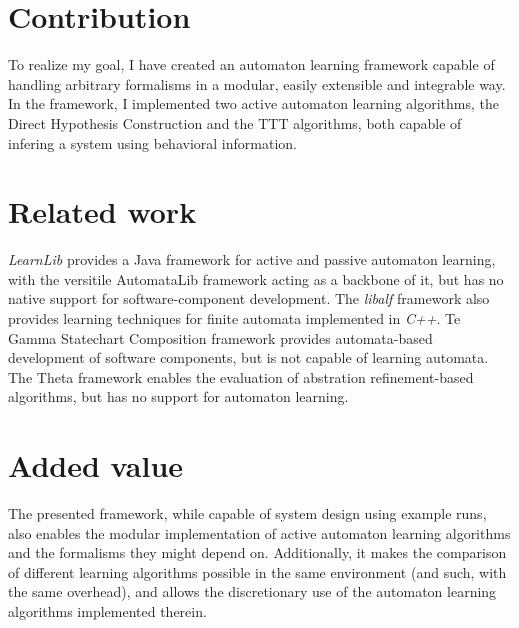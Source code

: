 \section{Contribution}

To realize my goal, I have created an automaton learning framework capable of handling arbitrary formalisms in a modular, easily extensible and integrable way. In the framework, I implemented two active automaton learning algorithms, the Direct Hypothesis Construction\cite{10.1007/978-3-642-34781-8_19} and the TTT\cite{10.1007/978-3-319-11164-3_26} algorithms, both capable of infering a system using behavioral information.

\section{Related work}



\emph{LearnLib}\cite{10.1007/978-3-319-21690-4_32} provides a Java framework for active and passive automaton learning, with the versitile AutomataLib framework acting as a backbone of it, but has no native support for software-component development. The \emph{libalf} framework also provides learning techniques for finite automata implemented in \emph{C++}. Te Gamma Statechart Composition framework\cite{DBLP:conf/icse/MolnarGVMV18} provides automata-based development of software components, but is not capable of learning automata. The Theta framework\cite{theta-fmcad2017} enables the evaluation of abstration refinement-based algorithms, but has no support for automaton learning.

\section{Added value}

The presented framework, while capable of system design using example runs, also enables the modular implementation of active automaton learning algorithms and the formalisms they might depend on. Additionally, it makes the comparison of different learning algorithms possible in the same environment (and such, with the same overhead), and allows the discretionary use of the automaton learning algorithms implemented therein.
